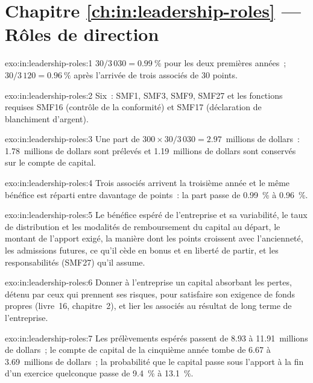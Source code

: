 \section*{Chapitre \ref{ch:in:leadership-roles} --- Rôles de direction}

\begin{solution}{exo:in:leadership-roles:1}
$30/3\,030=0.99~\%$ pour les deux premières années~; $30/3\,120=0.96~\%$ après l'arrivée de trois associés de 30 points.
\end{solution}

\begin{solution}{exo:in:leadership-roles:2}
Six~: SMF1, SMF3, SMF9, SMF27 et les fonctions requises SMF16 (contrôle de la conformité) et SMF17 (déclaration
de blanchiment d'argent).
\end{solution}

\begin{solution}{exo:in:leadership-roles:3}
Une part de $300\times30/3\,030=2.97$~millions de dollars~: 1.78~millions de dollars sont prélevés et 1.19~millions de dollars sont conservés sur le compte de capital.
\end{solution}

\begin{solution}{exo:in:leadership-roles:4}
Trois associés arrivent la troisième année et le même bénéfice est réparti entre davantage de points~: la part passe de 0.99~\% à
0.96~\%.
\end{solution}

\begin{solution}{exo:in:leadership-roles:5}
Le bénéfice espéré de l'entreprise et sa variabilité, le taux de distribution et les modalités de remboursement du capital au départ, le
montant de l'apport exigé, la manière dont les points croissent avec l'ancienneté, les admissions futures, ce qu'il cède en bonus et en liberté de partir, et les
responsabilités (SMF27) qu'il assume.
\end{solution}

\begin{solution}{exo:in:leadership-roles:6}
Donner à l'entreprise un capital absorbant les pertes, détenu par ceux qui prennent ses risques, pour satisfaire son exigence
de fonds propres (livre~16, chapitre~2), et lier les associés au résultat de long terme de l'entreprise.
\end{solution}

\begin{solution}{exo:in:leadership-roles:7}
Les prélèvements espérés passent de 8.93 à 11.91~millions de dollars~; le compte de capital de la cinquième année tombe de 6.67 à 3.69~millions de dollars~;
la probabilité que le capital passe sous l'apport à la fin d'un exercice quelconque passe de 9.4~\% à 13.1~\%.
\end{solution}

